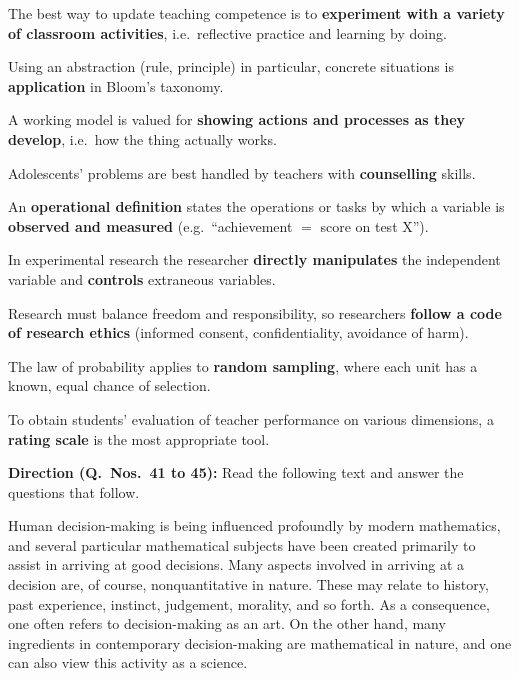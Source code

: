 The best way to update teaching competence is to \textbf{experiment with a variety of classroom activities}, i.e.\ reflective practice and learning by doing.

Using an abstraction (rule, principle) in particular, concrete situations is \textbf{application} in Bloom's taxonomy.

A working model is valued for \textbf{showing actions and processes as they develop}, i.e.\ how the thing actually works.

Adolescents' problems are best handled by teachers with \textbf{counselling} skills.

An \textbf{operational definition} states the operations or tasks by which a variable is \textbf{observed and measured} (e.g.\ ``achievement $=$ score on test X'').

In experimental research the researcher \textbf{directly manipulates} the independent variable and \textbf{controls} extraneous variables.

Research must balance freedom and responsibility, so researchers \textbf{follow a code of research ethics} (informed consent, confidentiality, avoidance of harm).

The law of probability applies to \textbf{random sampling}, where each unit has a known, equal chance of selection.

To obtain students' evaluation of teacher performance on various dimensions, a \textbf{rating scale} is the most appropriate tool.

\textbf{Direction (Q.~Nos.~41 to 45):} Read the following text and answer the questions that follow.\par\smallskip
Human decision-making is being influenced profoundly by modern mathematics, and several particular mathematical subjects have been created primarily to assist in arriving at good decisions. Many aspects involved in arriving at a decision are, of course, nonquantitative in nature. These may relate to history, past experience, instinct, judgement, morality, and so forth. As a consequence, one often refers to decision-making as an art. On the other hand, many ingredients in contemporary decision-making are mathematical in nature, and one can also view this activity as a science.

